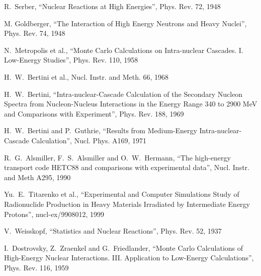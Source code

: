 \documentclass[twocolumn,twoside,slac,floatfix]{revtex4}
\begin{document}
 




%
%



\begin{thebibliography}{9}

R.~Serber, ``Nuclear Reactions at High Energies'',
Phys. Rev. 72, 1948

M. Goldberger, ``The Interaction of High Energy Neutrons and Heavy Nuclei'',
Phys. Rev. 74, 1948

N.~Metropolis et al., ``Monte Carlo Calculations on Intra-nuclear Cascades. I. Low-Energy Studies'',
Phys. Rev. 110, 1958

H.~W.~Bertini et al.,
Nucl. Instr. and Meth.  66, 1968


H.~W.~Bertini, ``Intra-nuclear-{C}ascade {C}alculation of the {S}econdary {N}ucleon {S}pectra from {N}ucleon-{N}ucleus 
        {I}nteractions in the {E}nergy {R}ange 340 to 2900 {M}e{V} and {C}omparisons with {E}xperiment'',
Phys. Rev.  188, 1969


H.~W.~Bertini and P.~Guthrie, ``Results from Medium-Energy Intra-nuclear-Cascade Calculation'',
Nucl. Phys.  A169, 1971

R.~G.~Alsmiller, F.~S.~Alsmiller and O.~W.~Hermann, 
``The high-energy transport code HETC88 and comparisons with experimental data'',
Nucl. Instr. and Meth A295, 1990

Yu.~E.~Titarenko et al.,
``Experimental and Computer Simulations Study of
		  Radionuclide Production in Heavy Materials
		  Irradiated by Intermediate Energy Protons'',
nucl-ex/9908012, 1999

V.~Weisskopf,
``Statistics and {N}uclear {R}eactions'',
Phys. Rev. 52, 1937

I.~Dostrovsky, Z.~Zraenkel and G.~Friedlander,
``Monte {C}arlo {C}alculations of {H}igh-{E}nergy {N}uclear {I}nteractions. {I}{I}{I}. 
{A}pplication to {L}ow-{E}nergy {C}alculations'',
Phys. Rev. 116, 1959


\end{thebibliography}
\end{document}
